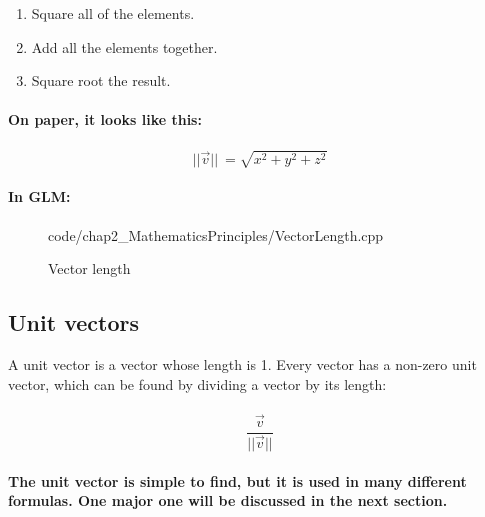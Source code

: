 \begin{enumerate}
    \large
    \item Square all of the elements.
    \item Add all the elements together.
    \item Square root the result.
\end{enumerate}

\paragraph{
    On paper, it looks like this:
}

\paragraph{
    \begin{equation*}
    ||\vec{v} ||\ =\sqrt{x^{2} +y^{2} +z^{2}}
    \end{equation*}
}

\paragraph{
    In GLM:
}

\begin{frame}{}
    \begin{figure}[ht]
    \centering
    \colorbox{backgroundcolor}{
        \parbox{0.9\textwidth}{
            
            {code/chap2_MathematicsPrinciples/VectorLength.cpp}
        }
    }
    \caption{Vector length}
    \label{fig:Vector length}
    \end{figure}
\end{frame}

\subsection{Unit vectors}
A unit vector is a vector whose length is 1. Every vector has a non-zero unit vector, which can be found by dividing a vector by its length:

\paragraph{
    \begin{equation*}
    \frac{\vec{v}}{||\vec{v} ||}
    \end{equation*}
}

\paragraph{
    The unit vector is simple to find, but it is used in many different formulas. One major one will be discussed in the next section.
}

